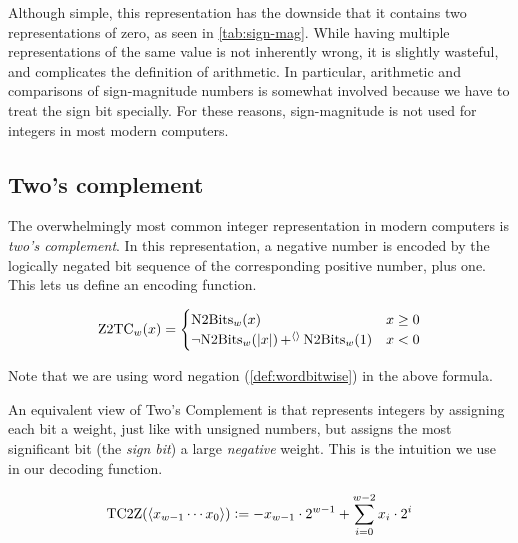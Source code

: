 Although simple, this representation has the downside that it contains
two representations of zero, as seen in \cref{tab:sign-mag}.  While
having multiple representations of the same value is not inherently
wrong, it is slightly wasteful, and complicates the definition of
arithmetic.  In particular, arithmetic and comparisons of
sign-magnitude numbers is somewhat involved because we have to treat
the sign bit specially.  For these reasons, sign-magnitude is not used
for integers in most modern computers.

\subsection{Two's complement}
\label{sec:twos-complement}

The overwhelmingly most common integer representation in modern
computers is \emph{two's complement}.  In this representation, a
negative number is encoded by the logically negated bit sequence of
the corresponding positive number, plus one.  This lets us define an
encoding function.

\begin{definition}
\begin{align*}
  \mathrm{Z2TC}_{w}(x) =
  \begin{cases}
    \mathrm{N2Bits}_{w}(x) & x \geq 0 \\
    \neg \mathrm{N2Bits}_{w}(|x|) \operatorname{+^{\langle\rangle}} \mathrm{N2Bits}_{w}(1) & x < 0
  \end{cases}
\end{align*}
\label{def:z2tc}
\end{definition}

Note that we are using word negation (\cref{def:wordbitwise}) in the
above formula.

An equivalent view of Two's Complement is that represents integers by
assigning each bit a weight, just like with unsigned numbers, but
assigns the most significant bit (the \emph{sign bit}) a large
\emph{negative} weight.  This is the intuition we use in our decoding
function.

\begin{definition}
\begin{align*}
  \mathrm{TC2Z}(\langle x_{w-1}\cdots x_{0} \rangle) \vcentcolon= -x_{w-1}\cdot 2^{w-1} + \sum_{i=0}^{w-2} x_{i} \cdot{} 2^{i}
\end{align*}
\label{def:tc2Z}
\end{definition}

